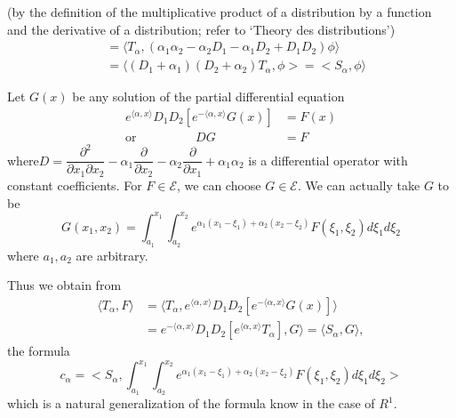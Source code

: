 (by the definition of the multiplicative product of a distribution by
a function and the derivative of a distribution; refer to `Theory des
distributions') 
\begin{align*}
  &= \langle T_\alpha,  (\alpha_1 \alpha_2 - \alpha_2 D_1 -\alpha_1 D_2
  + D_1 D_2 ) \phi \rangle \\ 
  &= \langle (D_1 + \alpha_1 ) (D_2 + \alpha_2 ) T_\alpha,  \phi > = <
  S_\alpha,  \phi \rangle 
\end{align*}

Let $G(x)$ be any solution of the partial differential equation
\begin{align*}
  e^{\langle \alpha,  x\rangle} D_1 D_2 \left[ e^{-\langle \alpha, x
      \rangle} G(x) \right] & = F(x) \tag{6}\label{part2:chap2:eq6}\\ 
  \text{or}\hspace{2cm}  DG & = F
  \tag*{$(6')$}\label{part2:chap2:eq6'}
\end{align*}
where\pageoriginale $D = \dfrac{\partial^2}{\partial x_1 \partial x_2}
-\alpha_1 
\dfrac{\partial}{\partial x_2} - \alpha_2 \dfrac{\partial}{\partial
  x_1} + \alpha_1 \alpha_2 $ is a differential operator with constant
coefficients. For $F \in \mathscr{E}$, we can choose $G \in
\mathscr{E}$. We can actually take $G$ to be  
\begin{equation}
  G(x_1, x_2) = \int_{a_1}^{x_1} \int_{a_2}^{x_2} e^{\alpha_1 (x_1 -
    \xi_1 ) + \alpha_2 (x_2 - \xi_2 )} F (\xi_1,  \xi_2 ) d \xi_1 d
  \xi_2 \tag{7}\label{part2:chap2:eq7} 
\end{equation}
where $a_1, a_2$ are arbitrary.

Thus we obtain from
\begin{align*}
  \langle T_\alpha,  F \rangle &= \langle T_\alpha,  e^{\langle \alpha,
    x \rangle} D_1 D_2 \left[ e^{- \langle\alpha,  x\rangle} G(x)
    \right] \rangle \\ 
  & = e^{-\langle \alpha,  x \rangle} D_1 D_2 \left[ e^{\langle \alpha,
      x \rangle} T_\alpha \right],  G \rangle = \langle S_\alpha, G
  \rangle, 
\end{align*}
the formula\label{page79}
\begin{equation}
  c_\alpha = < S_\alpha,  \int_{a_1}^{x_1} \int_{a_2}^{x_2}
  e^{\alpha_1 (x_1 - \xi_1 ) + \alpha_2 (x_2 - \xi_2 )} F (\xi_1,
  \xi_2 ) d \xi_1 d \xi_2 > \tag{8}\label{part2:chap2:eq8} 
\end{equation}
which is a natural generalization of the formula know in the case of $R^1$.

